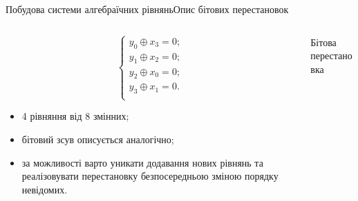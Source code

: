 \documentclass[10pt, ucs]{beamer}
\begin{document}
\begin{frame}{Побудова системи алгебраїчних рівнянь}{Опис бітових перестановок}
    \begin{columns}
        \begin{column}{0.48\textwidth}
            \begin{block}{}
                \begin{equation}
                    \nonumber
                    \left\{
                    \begin{array}{ll}
                        y_0 \oplus x_3 = 0; \\
                        y_1 \oplus x_2 = 0; \\
                        y_2 \oplus x_0 = 0; \\
                        y_3 \oplus x_1 = 0. \\
                    \end{array} \right.
                \end{equation}
            \end{block}
            \begin{block}{}
                \begin{itemize}
                    \item 4 рівняння від 8 змінних;
                    \item бітовий зсув описується аналогічно;
                    \item за можливості варто уникати додавання нових рівнянь
                        та реалізовувати перестановку безпосередньою зміною
                        порядку невідомих.
                \end{itemize}
            \end{block}
        \end{column}%
        \begin{column}{0.5\textwidth}
            \hspace{1em}
            \begin{block}{Бітова перестановка}
                \begin{figure}[htbp]
                    \centering
                    \vspace{6ex}
                    
                    \vspace{6ex}
                \end{figure}
            \end{block}
        \end{column}
    \end{columns}
\end{frame}
\end{document}
